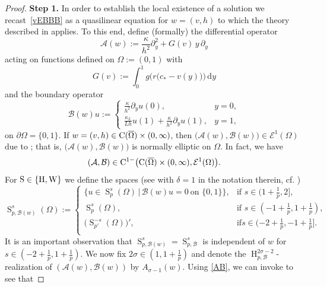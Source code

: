 \documentclass[reqno,11pt]{amsart}
\numberwithin{equation}{section}
\newcommand{\rd}{\mathrm{d}}
\begin{document}
\begin{proof}
{\bf Step 1.} In order to establish the local existence of a solution we recast~\eqref{vEBBB} as a quasilinear equation for $w=(v,h)$ to
which the theory described in \cite{Amann_Teubner} applies. To this
end, define (formally) the differential operator
$$
\mathcal{A}(w):= \frac{\kappa}{h^2} \partial_y^2 +G(v)\,  y \,\partial_y 
$$
acting on functions defined on $\Omega:=(0,1)$ with
$$
G(v):=\int_0^1 g\big(r\big(c_*-v(y)\big)\big)\,\rd y
$$
and the boundary operator
$$
\mathcal{B}(w)u:=\begin{cases} \frac{\kappa}{h^2}\partial_y u(0), &
  y=0,\\[1ex]
 \frac{\kappa_L}{Lh}u(1)+\frac{\kappa}{h^2} \partial_yu(1), & y=1,
\end{cases} 
$$
 on $\partial\Omega=\{0,1\}$.
If $w=(v,h)\in {\rm C}(\overline{\Omega})\times (0,\infty)$, then
$\bigl(\mathcal{A}(w),\mathcal{B}(w)\bigr)\in \mathcal{E}^1(\Omega)$ due to
\cite[Example~4.3~(e)]{Amann_Teubner}; that is,
$\bigl(\mathcal{A}(w),\mathcal{B}(w)\bigr)$ is normally elliptic on
$\Omega$. In fact, we have 
\begin{equation}\label{AB}
(\mathcal{A},\mathcal{B})\in
{\rm C}^{1-}\bigl({\rm C}(\overline{\Omega})\times
(0,\infty),\mathcal{E}^1(\Omega)\bigr). 
\end{equation}
For ${\rm S}\in\{\operatorname{H},\operatorname{W}\}$ we define the spaces (see
\cite[Section~7]{Amann_Teubner} with $\delta=1$ in the notation
therein, cf. \cite[Equation (7.5)]{Amann_Teubner}) 
$$
\operatorname{S}_{p,\mathcal{B}(w)}^s(\Omega):=\begin{cases} \big\{u\in
  \operatorname{S}_{p}^s(\Omega)\,\vert\, \mathcal{B}(w) u=0 \ \text{on }
  \{0,1\}\big\}, &\text{if }s\in(1+\frac{1}{p},2],\\[1ex]
 \operatorname{S}_{p}^s(\Omega) , &\text{if }s\in(-1+\frac{1}{p},1+\frac{1}{p}),\\[1ex]
\big( \operatorname{S}_{p'}^{-s}(\Omega)\big)' , &\text{if
}s\in(-2+\frac{1}{p},-1+\frac{1}{p}].\\[1ex]
\end{cases} 
$$
It is an important observation that
$\operatorname{S}_{p,\mathcal{B}(w)}^s=\operatorname{S}_{p,\mathcal{B}}^s$ is independent of $w$ for
$s\in(-2+\frac{1}{p}, 1+\frac{1}{p})$. We now fix $2\sigma\in
(1,1+\frac{1}{p})$ and denote the $\operatorname{H}_{p,\mathcal{B}}^{2\sigma-2}$-realization of
$(\mathcal{A}(w),\mathcal{B}(w))$ by $A_{\sigma-1}(w)$. Using
\eqref{AB}, we can invoke \cite[Theorem~8.3]{Amann_Teubner} to see that

\end{proof}
\end{document}
